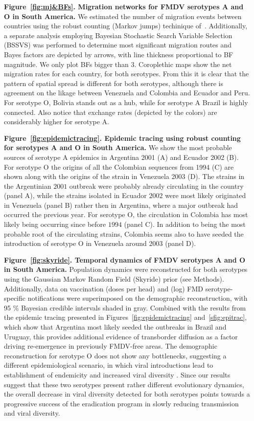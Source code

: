 \documentclass[10pt]{article}
\begin{document}
{\bf Figure~\ref{fig:mj&BFs}. Migration networks for FMDV serotypes A and O in South America.} We estimated the number of migration events between countries using the robust counting (Markov jumps) techinique of~\cite{Minin2008}.
Additionally, a separate analysis employing Bayesian Stochastic Search Variable Selection (BSSVS) was performed to determine most significant migration routes and Bayes factors are depicted by arrows, with line thickness proportional to BF magnitude.
We only plot BFs bigger than $3$.
Coroplethic maps show the net migration rates for each country, for both serotypes.
From this it is clear that the pattern of spatial spread is different for both serotypes, although there is agreement on the likage between Venezuela and Colombia and Ecuador and Peru.
For serotype O, Bolivia stands out as a hub, while for serotype A Brazil is highly connected.
Also notice that exchange rates (depicted by the colors) are considerably higher for serotype A.

{\bf Figure~\ref{fig:epidemictracing}. Epidemic tracing using robust counting for serotypes A and O in South America.} We show the most probable sources of serotype A epidemics in Argentina 2001 (A) and Ecuador 2002 (B).
For serotype O the origins of  all the Colombian sequences from 1994 (C) are shown along with the origins of the strain in Venezuela 2003 (D).
The strains in the Argentinian $2001$ outbreak were probably already circulating in the country (panel A), while the strains isolated in Ecuador $2002$ were most likely originated in Venezuela (panel B) rather then in Argentina, where a major outbreak had occurred the previous year.
For serotype O, the circulation in Colombia has most likely being occurring since before $1994$ (panel C).
In addition to being the most probable root of the circulating strains, Colombia seems also to have seeded the introduction of serotype O in Venezuela around $2003$ (panel D).

{\bf Figure~\ref{fig:skyride}. Temporal dynamics of FMDV serotypes A and O in South America.} Population dynamics were reconstructed for both serotypes using the Gaussian Markov Random Field (Skyride) prior (see Methods).
Additionally, data on vaccination (doses per head) and (log) FMD serotype-specific notifications were superimposed on the demographic reconstruction, with 95 \% Bayesian credible intervals shaded in gray.
Combined with the results from the epidemic tracing presented in Figures~\ref{fig:epidemictracing} and~\ref{sfig:epitrac}, which show that Argentina most likely seeded the outbreaks in Brazil and Uruguay, this provides additional evidence of transborder diffusion as a factor driving re-emergence in previously FMDV-free areas.
The demographic reconstruction for serotype O does not show any bottlenecks, suggesting a different epidemiological scenario, in which viral introductions lead to establishment of endemicity and increased viral diversity .
Since our results suggest that these two serotypes present rather different evolutionary dynamics, the overall decrease in viral diversity detected for both serotypes points towards a progressive success of the eradication program in slowly reducing transmission and viral diversity.
\end{document}
